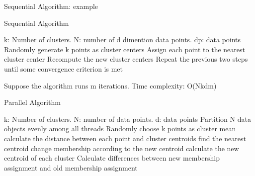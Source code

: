 \documentclass[
nopagebreaks,
style=klope,
fleqn]{powerdot}
\begin{document}
\begin{slide} {Sequential Algorithm: example}
\begin{figure}[h]
  \end{figure}
\end{slide}

\begin{slide} {Sequential Algorithm}
  \begin{algorithmic}[1]
    \INPUT k: Number of clusters. N: number of d dimention data points. dp: data points 
    \State Randomly generate k points as cluster centers
    \State Assign each point to the nearest cluster center
    \State Recompute the new cluster centers
    \State Repeat the previous two steps until some convergence criterion
    is met
    \EndFunction
  \end{algorithmic}
  \begin{compactitem}
    \item{Suppose the algorithm runs m iterations. Time complexity: O(Nkdm)}
  \end{compactitem}
\end{slide}

\begin{slide} {Parallel Algorithm}
  \footnotesize
  \begin{algorithmic}[1]
    \INPUT k: Number of clusters. N: number of data points. d: data points
     \label{alg:p}
    \State Partition N data objects evenly among all threads
    \State Randomly choose k points as cluster mean
    \State calculate the distance between each point and
    cluster centroids
    \State find the nearest centroid
    \State change membership according to the new centroid
    \State calculate the new centroid of each cluster
    \EndParFor
    \State Calculate differences between new membership assignment and
    old membership assignment
    \EndWhile
    \EndFunction  
  \end{algorithmic}
\end{slide}
\end{document}

